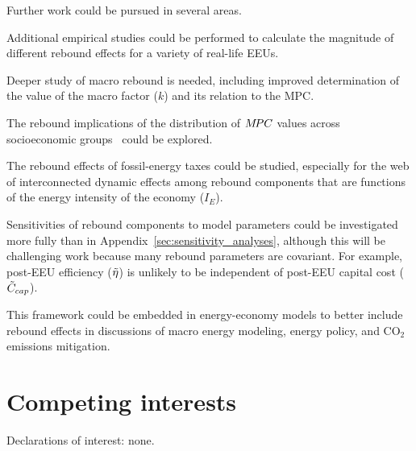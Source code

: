 \documentclass[12pt]{article}\usepackage[]{graphicx}\usepackage[]{xcolor}
\begin{document}
Further work could be pursued in several areas. 
%
\begin{enumerate*}[label={(\roman*)}]
	
  \item Additional empirical studies could be performed
        to calculate the magnitude of different 
        rebound effects for a variety of real-life EEUs.

  \item Deeper study of macro rebound is needed, including improved determination 
        of the value of the macro factor ($k$) and its relation to the MPC.
        
  \item The rebound implications of the distribution of $M\!PC$ values 
        across socioeconomic groups~\citep{Carroll2017}
        could be explored.
        
  \item The rebound effects of fossil-energy taxes 
        could be studied,
        especially for the web of interconnected dynamic effects
        among rebound components that are functions
        of the energy intensity of the economy ($I_E$).
        
  \item Sensitivities of rebound components to model parameters
        could be investigated more fully 
        than in Appendix~\ref{sec:sensitivity_analyses}, although
        this will be challenging work because
        many rebound parameters are covariant.
        For example, post-EEU efficiency ($\tilde{\eta}$)
        is unlikely to be independent of post-EEU capital cost ($\tilde{C}_{cap}$).

  \item This framework could be embedded 
        in energy-economy models to better include rebound effects 
        in discussions of macro energy modeling, energy policy, and 
        CO$_2$ emissions mitigation.
        
\end{enumerate*}


\section*{Competing interests}
\label{sec:competing_interests}

Declarations of interest: none.
\end{document}
